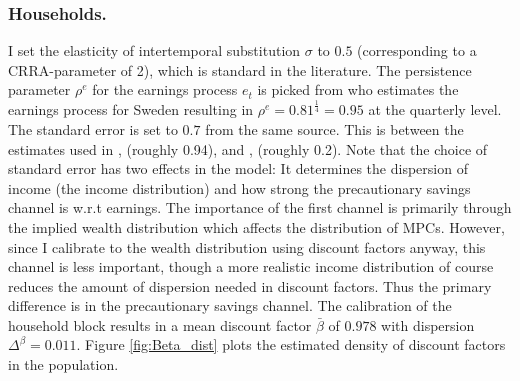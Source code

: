 \subsubsection*{Households.} I set the elasticity of intertemporal substitution $\sigma$ to $0.5$ (corresponding to a CRRA-parameter of 2), which is standard in the literature. The persistence parameter $\rho^e$ for the earnings process $e_t$ is picked from \citet{floden2001idiosyncratic} who estimates the earnings process for Sweden resulting in $\rho^e = 0.81^\frac{1}{4}=0.95$ at the quarterly level. The standard error is set to $0.7$ from the same source. This is between the estimates used in \citet{kaplan2018monetary}, \citet{auclert2018intertemporal} (roughly 0.94), and \citet{hagedorn2019fiscal}, \citet{gornemann2016doves} (roughly 0.2). Note that the choice of standard error has two effects in the model: It determines the dispersion of income (the income distribution) and how strong the precautionary savings channel is w.r.t earnings. The importance of the first channel is primarily through the implied wealth distribution which affects the distribution of MPCs. However, since I calibrate to the wealth distribution using discount factors anyway, this channel is less important, though a more realistic income distribution of course reduces the amount of dispersion needed in discount factors. Thus the primary difference is in the precautionary savings channel. The calibration of the household block results in a mean discount factor $\bar{\beta}$ of $ 0.978$ with dispersion $\Delta^\beta=0.011$. Figure \ref{fig:Beta_dist} plots the estimated density of discount factors in the population.  \\




